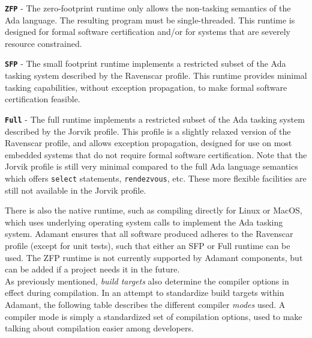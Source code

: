 \vspace{5mm} %
\begin{spaceditemize}
  \item \textbf{\texttt{ZFP}} - The zero-footprint runtime only allows the non-tasking semantics of the Ada language. The resulting program must be single-threaded. This runtime is designed for formal software certification and/or for systems that are severely resource constrained.
  \item \textbf{\texttt{SFP}} - The small footprint runtime implements a restricted subset of the Ada tasking system described by the Ravenscar profile. This runtime provides minimal tasking capabilities, without exception propagation, to make formal software certification feasible.
  \item \textbf{\texttt{Full}} - The full runtime implements a restricted subset of the Ada tasking system described by the Jorvik profile. This profile is a slightly relaxed version of the Ravenscar profile, and allows exception propagation, designed for use on most embedded systems that do not require formal software certification. Note that the Jorvik profile is still very minimal compared to the full Ada language semantics which offers \texttt{select} statements, \texttt{rendezvous}, etc. These more flexible facilities are still not available in the Jorvik profile.
\end{spaceditemize}
\vspace{5mm} %

There is also the native runtime, such as compiling directly for Linux or MacOS, which uses underlying operating system calls to implement the Ada tasking system. Adamant ensures that all software produced adheres to the Ravenscar profile (except for unit tests), such that either an SFP or Full runtime can be used. The ZFP runtime is not currently supported by Adamant components, but can be added if a project needs it in the future. \\

As previously mentioned, \textit{build targets} also determine the compiler options in effect during compilation. In an attempt to standardize build targets within Adamant, the following table describes the different compiler \textit{modes} used. A compiler mode is simply a standardized set of compilation options, used to make talking about compilation easier among developers.

